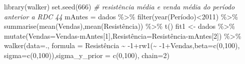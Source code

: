 \documentclass[
]{book}
\newenvironment{Shaded}{\begin{snugshade}}{\end{snugshade}}
\newcommand{\AttributeTok}[1]{\textcolor[rgb]{0.77,0.63,0.00}{#1}}
\newcommand{\CommentTok}[1]{\textcolor[rgb]{0.56,0.35,0.01}{\textit{#1}}}
\newcommand{\DecValTok}[1]{\textcolor[rgb]{0.00,0.00,0.81}{#1}}
\newcommand{\FunctionTok}[1]{\textcolor[rgb]{0.00,0.00,0.00}{#1}}
\newcommand{\NormalTok}[1]{#1}
\newcommand{\OtherTok}[1]{\textcolor[rgb]{0.56,0.35,0.01}{#1}}
\newcommand{\SpecialCharTok}[1]{\textcolor[rgb]{0.00,0.00,0.00}{#1}}
\begin{document}
\begin{Shaded}
\begin{Highlighting}[]
\FunctionTok{library}\NormalTok{(walker)}
\FunctionTok{set.seed}\NormalTok{(}\DecValTok{666}\NormalTok{)}
\CommentTok{\# resistência média e venda média do período anterior a RDC 44}
\NormalTok{mAntes }\OtherTok{=}\NormalTok{ dados }\SpecialCharTok{\%\textgreater{}\%} \FunctionTok{filter}\NormalTok{(}\FunctionTok{year}\NormalTok{(Período)}\SpecialCharTok{\textless{}}\DecValTok{2011}\NormalTok{) }\SpecialCharTok{\%\textgreater{}\%} 
        \FunctionTok{summarise}\NormalTok{(}\FunctionTok{mean}\NormalTok{(Vendas),}\FunctionTok{mean}\NormalTok{(Resistência)) }\SpecialCharTok{\%\textgreater{}\%} \FunctionTok{t}\NormalTok{()}
\NormalTok{fit1 }\OtherTok{\textless{}{-}}\NormalTok{ dados }\SpecialCharTok{\%\textgreater{}\%} 
  \FunctionTok{mutate}\NormalTok{(}\AttributeTok{Vendas=}\NormalTok{Vendas}\SpecialCharTok{{-}}\NormalTok{mAntes[}\DecValTok{1}\NormalTok{],Resistência}\OtherTok{=}\NormalTok{Resistência}\SpecialCharTok{{-}}\NormalTok{mAntes[}\DecValTok{2}\NormalTok{]) }\SpecialCharTok{\%\textgreater{}\%}
  \FunctionTok{walker}\NormalTok{(}\AttributeTok{data=}\NormalTok{., }\AttributeTok{formula =}\NormalTok{ Resistência }\SpecialCharTok{\textasciitilde{}} \SpecialCharTok{{-}}\DecValTok{1}\SpecialCharTok{+}\FunctionTok{rw1}\NormalTok{(}\SpecialCharTok{\textasciitilde{}} \SpecialCharTok{{-}}\DecValTok{1}\SpecialCharTok{+}\NormalTok{Vendas,}\AttributeTok{beta=}\FunctionTok{c}\NormalTok{(}\DecValTok{0}\NormalTok{,}\DecValTok{100}\NormalTok{),}
    \AttributeTok{sigma=}\FunctionTok{c}\NormalTok{(}\DecValTok{0}\NormalTok{,}\DecValTok{100}\NormalTok{)),}\AttributeTok{sigma\_y\_prior =} \FunctionTok{c}\NormalTok{(}\DecValTok{0}\NormalTok{,}\DecValTok{100}\NormalTok{), }\AttributeTok{chain=}\DecValTok{2}\NormalTok{)}
\end{Highlighting}
\end{Shaded}
\end{document}
